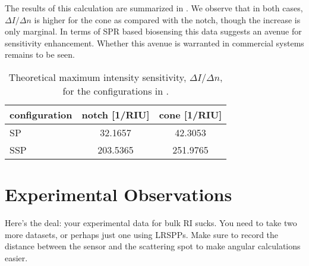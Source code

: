 The results of this calculation are summarized in
.  We observe that in both cases, $\Delta I/\Delta
n$ is higher for the cone as compared with the notch, though the increase
is only marginal.  In terms of SPR based biosensing this data suggests an
avenue for sensitivity enhancement.  Whether this avenue is warranted in
commercial systems remains to be seen.
\begin{table}[ht]
\centering
{}
\begin{tabular}{lSS}
\toprule
{configuration} & {notch [1/RIU]} & {cone [1/RIU]} \\
\midrule
SP & 32.1657 & 42.3053 \\
SSP & 203.5365 & 251.9765 \\
\bottomrule
\end{tabular}
\caption{Theoretical maximum intensity sensitivity, $\Delta I/\Delta n$,
								for the configurations in . }
\label{tbl:intensitysens}
\end{table}

\section{Experimental Observations}
Here's the deal: your experimental data for bulk RI sucks.  You need to
take two more datasets, or perhaps just one using LRSPPs.  Make sure to
record the distance between the sensor and the scattering spot to make
angular calculations easier.
